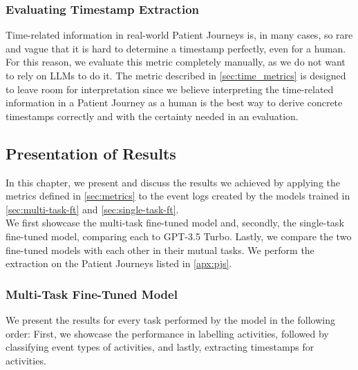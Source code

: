 \subsubsection{Evaluating Timestamp Extraction}\label{sec:eval_time}
Time-related information in real-world Patient Journeys is, in many cases, so rare and vague that it is hard to determine a timestamp perfectly, even for a human. For this reason, we evaluate this metric completely manually, as we do not want to rely on LLMs to do it. The metric described in \autoref{sec:time_metrics} is designed to leave room for interpretation since we believe interpreting the time-related information in a Patient Journey as a human is the best way to derive concrete timestamps correctly and with the certainty needed in an evaluation.

\subsection{Presentation of Results}\label{sec:results}
In this chapter, we present and discuss the results we achieved by applying the metrics defined in \autoref{sec:metrics} to the event logs created by the models trained in \autoref{sec:multi-task-ft} and \autoref{sec:single-task-ft}.\\
We first showcase the multi-task fine-tuned model and, secondly, the single-task fine-tuned model, comparing each to GPT-3.5 Turbo. Lastly, we compare the two fine-tuned models with each other in their mutual tasks. We perform the extraction on the Patient Journeys listed in \ref{apx:pjs}.

\subsubsection{Multi-Task Fine-Tuned Model}\label{sec_eval_multi}
We present the results for every task performed by the model in the following order: First, we showcase the performance in labelling activities, followed by classifying event types of activities, and lastly, extracting timestamps for activities.

